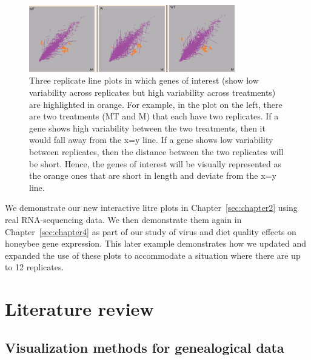 \documentclass[11pt,a4paper,oldfontcommands,openany]{memoir}
\numberwithin{equation}{section} %
\begin{document}
\begin{enumerate}
\begin{figure}[H]
\centering
    \begin{framed}
    \includegraphics[width=0.8\textwidth]{porcupine}
    \end{framed}
    \caption{Three replicate line plots in which genes of interest (show low variability across replicates but high variability across treatments) are highlighted in orange. For example, in the plot on the left, there are two treatments (MT and M) that each have two replicates. If a gene shows high variability between the two treatments, then it would fall away from the x=y line. If a gene shows low variability between replicates, then the distance between the two replicates will be short. Hence, the genes of interest will be visually represented as the orange ones that are short in length and deviate from the x=y line.}
    \label{fig:porcupine}
\end{figure}

We demonstrate our new interactive litre plots in Chapter~\ref{sec:chapter2} using real RNA-sequencing data. We then demonstrate them again in Chapter~\ref{sec:chapter4} as part of our study of virus and diet quality effects on honeybee gene expression. This later example demonstrates how we updated and expanded the use of these plots to accommodate a situation where there are up to 12 replicates.

\end{enumerate}


\section{Literature review}
\label{sec:litReview}
\subsection{Visualization methods for genealogical data}
\end{document}
